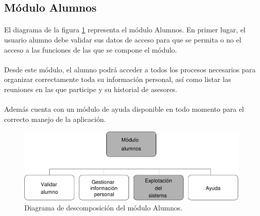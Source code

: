 \subsection{Módulo Alumnos}

  \paragraph{}El diagrama de la figura
  \ref{diagramaDescomposicionAlumnos} representa el módulo Alumnos. En primer
  lugar, el usuario alumno debe validar sus datos de acceso para que se permita
  o no el acceso a las funciones de las que se compone el módulo.

  \paragraph{}Desde este módulo, el alumno podrá acceder a todos los procesos
  necesarios para organizar correctamente toda su información personal, así
  como listar las reuniones en las que participe y su historial de asesores.

  \paragraph{}Además cuenta con un módulo de ayuda disponible en todo momento
  para el correcto manejo de la aplicación.

  \begin{figure}[!ht]
    \begin{center}
      \includegraphics[]{11.Disenyo_Arquitectonico/11.2.Diagramas_Descomposicion/11.2.5.Modulo_alumnos/Diagramas/alumnos.pdf}
      \caption{Diagrama de descomposición del módulo Alumnos.}
      \label{diagramaDescomposicionAlumnos}
    \end{center}
  \end{figure}

% 